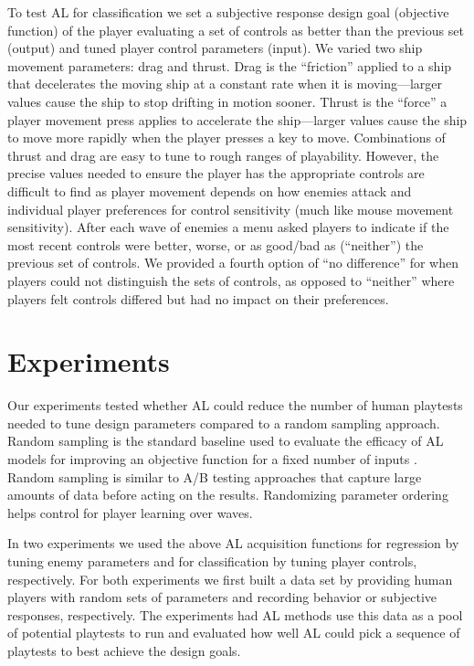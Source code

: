 \documentclass{sig-alternate}
\begin{document}
To test AL for classification we set a subjective response design goal (objective function) of the player evaluating a set of controls as better than the previous set (output) and tuned player control parameters (input).
We varied two ship movement parameters: drag and thrust. 
Drag is the ``friction'' applied to a ship that decelerates the moving ship at a constant rate when it is moving---larger values cause the ship to stop drifting in motion sooner. 
Thrust is the ``force'' a player movement press applies to accelerate the ship---larger values cause the ship to move more rapidly when the player presses a key to move. 
%
Combinations of thrust and drag are easy to tune to rough ranges of playability.
However, the precise values needed to ensure the player has the appropriate controls are difficult to find as player movement depends on how enemies attack and individual player preferences for control sensitivity (much like mouse movement sensitivity).
After each wave of enemies a menu asked players to indicate if the most recent controls were better, worse, or as good/bad as (``neither'') the previous set of controls.
We provided a fourth option of ``no difference'' for when players could not distinguish the sets of controls, as opposed to ``neither'' where players felt controls differed but had no impact on their preferences.





\section{Experiments}
Our experiments tested whether AL could reduce the number of human playtests needed to tune design parameters compared to a random sampling approach.
Random sampling is the standard baseline used to evaluate the efficacy of AL models for improving an objective function for a fixed number of inputs \cite{settles2012:al-book}. 
Random sampling is similar to A/B testing approaches that capture large amounts of data before acting on the results.
Randomizing parameter ordering helps control for player learning over waves.

In two experiments we used the above AL acquisition functions for regression by tuning enemy parameters and for classification by tuning player controls, respectively.
For both experiments we first built a data set by providing human players with random sets of parameters and recording behavior or subjective responses, respectively.
The experiments had AL methods use this data as a pool of potential playtests to run and evaluated how well AL could pick a sequence of playtests to best achieve the design goals.
\end{document}
